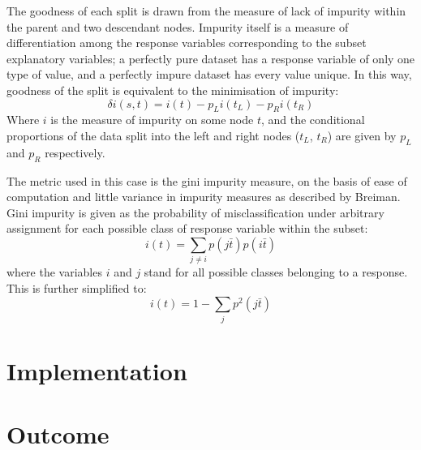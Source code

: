 \documentclass[a4paper,10pt]{article}
\begin{document}
The goodness of each split is drawn from the measure of lack of impurity
within the parent and two descendant nodes.
Impurity itself is a measure of differentiation among the response variables
corresponding to the subset explanatory variables; a perfectly pure dataset has
a response variable of only one type of value, and a perfectly impure dataset
has every value unique.
In this way, goodness of the split is equivalent to the minimisation of
impurity:
\begin{equation}
	\delta i (s, t) = i(t) - p_L i(t_L) - p_R i(t_R)
\end{equation}
Where \(i\) is the measure of impurity on some node \(t\), and the
conditional proportions of the data split into the left and right nodes
(\(t_L\), \(t_R\)) are given by \(p_L\) and \(p_R\) respectively.

The metric used in this case is the gini impurity measure, on the basis of ease
of computation and little variance in impurity measures as described by
Breiman.
Gini impurity is given as the probability of misclassification under arbitrary
assignment for each possible class of response variable within the subset:
\begin{equation}
	i(t) = \sum_{j \neq i} p(j \bar t) p(i \bar t)
\end{equation}
where the variables \(i\) and \(j\) stand for all possible classes belonging to
a response.
This is further simplified to:
\begin{equation}
	i(t) = 1 - \sum_j p^2(j \bar t)
\end{equation}


\section{Implementation}





\section{Outcome}


\printbibliography{}
\end{document}

